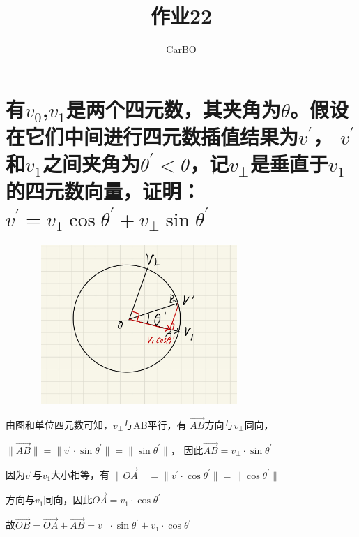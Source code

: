 \documentclass[utf8]{ctexart}
\title{\zihao{1}作业22}
\author{\zihao{-3}CarBO}
\date{}
\begin{document}
\maketitle
    \section{有$v_0$,$v_1$是两个四元数，其夹角为$\theta$。假设在它们中间进行四元数插值结果为$v^\prime$，
    $v^\prime$和$v_1$之间夹角为$\theta^\prime<\theta$，记$v_\perp$是垂直于$v_1$的四元数向量，证明：
    $v^\prime=v_1\cos\theta^\prime+v_\perp\sin\theta^\prime$}
    \begin{figure}[h]
        \centering
        \includegraphics[scale=0.6,width=8cm,height=6cm]{1111.jpg}
    \end{figure}
    由图和单位四元数可知，$v_\perp$与AB平行，有 $\overrightarrow{AB}$方向与$v_\perp$同向，

    $\|\overrightarrow{AB}\| =\|v^\prime\cdot\sin\theta^\prime\|=\|\sin\theta^\prime\|$，
    因此$\overrightarrow{AB} =v_\perp\cdot\sin\theta^\prime$


    因为$v^\prime$与$v_1$大小相等，有
    $\|\overrightarrow{OA}\|=\|v^\prime\cdot\cos\theta^\prime\|=\|\cos\theta^\prime\|$

    方向与$v_1$同向，因此$\overrightarrow{OA}=v_1\cdot\cos\theta^\prime$


    故$\overrightarrow{OB}=\overrightarrow{OA}+\overrightarrow{AB}
    =v_\perp\cdot\sin\theta^\prime+v_1\cdot\cos\theta^\prime$
\end{document}
